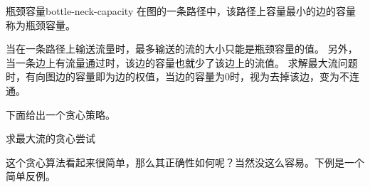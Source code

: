 \begin{definition}{瓶颈容量}{bottle-neck-capacity}
	在图的一条路径中，该路径上容量最小的边的容量称为瓶颈容量。
\end{definition}

	\par 当在一条路径上输送流量时，最多输送的流的大小只能是瓶颈容量的值。
	另外，当一条边上有流量通过时，该边的容量也就少了该边上的流值。
	求解最大流问题时，有向图边的容量即为边的权值，当边的容量为0时，视为去掉该边，变为不连通。

	下面给出一个贪心策略。

\begin{algorithm}
	\caption{求最大流的贪心尝试}\label{alg:greedy-max-flow}
\end{algorithm}

	\par 这个贪心算法看起来很简单，那么其正确性如何呢？当然没这么容易。下例是一个简单反例。

